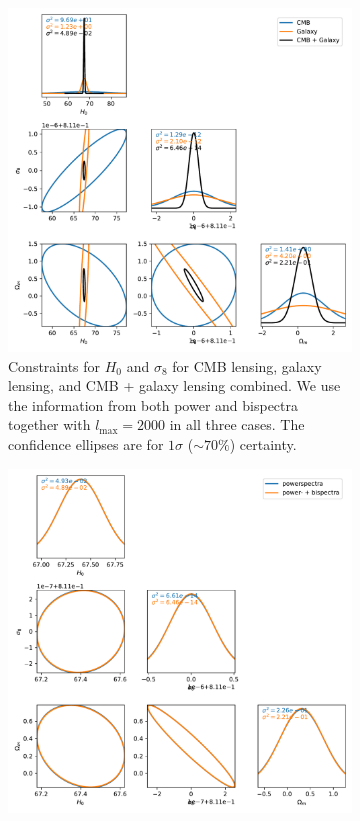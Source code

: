 \documentclass[11pt]{article} %
\begin{document}
\begin{figure}[htbp]
    \centering
    \begin{subfigure}[t]{0.48\textwidth}
        \centering
        \includegraphics[width=\textwidth]{paramconstraints_sigma8.pdf}
        \caption{Constraints for $H_0$ and $\sigma_8$ for CMB lensing, galaxy lensing, and CMB + galaxy lensing combined. We use the information from both power and bispectra together with $l_{\max}=2000$ in all three cases.
        The confidence ellipses are for $1\sigma$ ($\sim70\%$) certainty.}
        \label{fig:sigma8const}
    \end{subfigure}
    \hfill
    \begin{subfigure}[t]{0.48\textwidth}
        \centering
        \includegraphics[width=\textwidth]{paramconstraints_sigma8_diffspectra.pdf}

\end{subfigure}
\end{figure}
\end{document}

